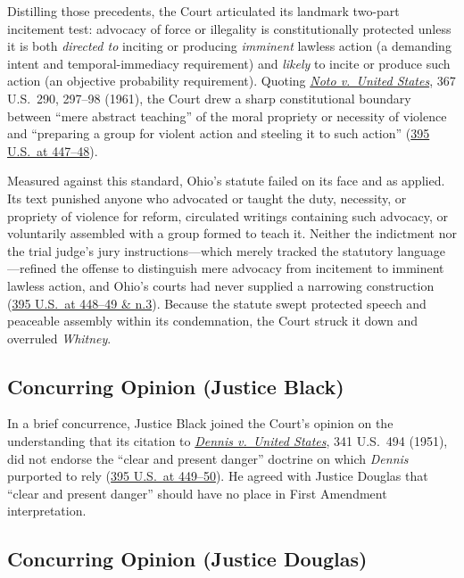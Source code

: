 \documentclass[12pt]{article}
\begin{document}
Distilling those precedents, the Court articulated its landmark two-part incitement test: advocacy of force or illegality is constitutionally protected unless it is both \emph{directed to} inciting or producing \emph{imminent} lawless action (a demanding intent and temporal-immediacy requirement) and \emph{likely} to incite or produce such action (an objective probability requirement). Quoting \href{https://supreme.justia.com/cases/federal/us/367/290/}{\emph{Noto v.\ United States}}, 367 U.S.\ 290, 297--98 (1961), the Court drew a sharp constitutional boundary between ``mere abstract teaching'' of the moral propriety or necessity of violence and ``preparing a group for violent action and steeling it to such action'' (\href{https://supreme.justia.com/cases/federal/us/395/444/}{395 U.S.\ at 447--48}).

Measured against this standard, Ohio's statute failed on its face and as applied. Its text punished anyone who advocated or taught the duty, necessity, or propriety of violence for reform, circulated writings containing such advocacy, or voluntarily assembled with a group formed to teach it. Neither the indictment nor the trial judge's jury instructions---which merely tracked the statutory language---refined the offense to distinguish mere advocacy from incitement to imminent lawless action, and Ohio's courts had never supplied a narrowing construction (\href{https://supreme.justia.com/cases/federal/us/395/444/}{395 U.S.\ at 448--49 \& n.3}). Because the statute swept protected speech and peaceable assembly within its condemnation, the Court struck it down and overruled \emph{Whitney}.

\subsection{Concurring Opinion (Justice Black)}

In a brief concurrence, Justice Black joined the Court's opinion on the understanding that its citation to \href{https://supreme.justia.com/cases/federal/us/341/494/}{\emph{Dennis v.\ United States}}, 341 U.S.\ 494 (1951), did not endorse the ``clear and present danger'' doctrine on which \emph{Dennis} purported to rely (\href{https://supreme.justia.com/cases/federal/us/395/444/}{395 U.S.\ at 449--50}). He agreed with Justice Douglas that ``clear and present danger'' should have no place in First Amendment interpretation.

\subsection{Concurring Opinion (Justice Douglas)}
\end{document}

